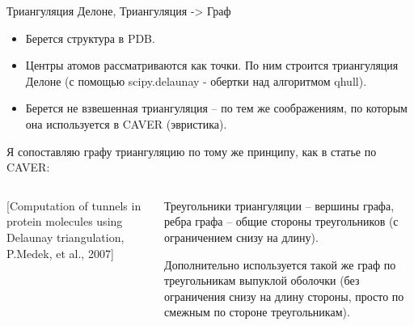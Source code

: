 \documentclass[10pt, xcolor={dvipsnames}]{beamer}
\begin{document}
\small
\begin{frame}{Триангуляция Делоне, Триангуляция -> Граф}
\begin{itemize}
\item Берется структура в PDB.
\item Центры атомов рассматриваются как точки. По ним строится триангуляция Делоне (с помощью scipy.delaunay - обертки над алгоритмом qhull).
\item Берется не взвешенная триангуляция -- по тем же соображениям, по которым она используется в CAVER (эвристика).
\end{itemize}
Я сопоставляю графу триангуляцию по тому же принципу, как в статье по CAVER:
\begin{columns}
\begin{column}{0.5\textwidth}
\begin{center}

[Computation of tunnels in protein molecules using
Delaunay triangulation, P.Medek, et al., 2007]
\end{center}
\end{column}
\begin{column}{0.5\textwidth}
Треугольники триангуляции -- вершины графа, ребра графа -- общие стороны треугольников (с ограничением снизу на длину).

Дополнительно используется такой же граф по треугольникам выпуклой оболочки (без ограничения снизу на длину стороны, просто по смежным по стороне треугольникам).
\end{column}
\end{columns}


\end{frame}
\end{document}
